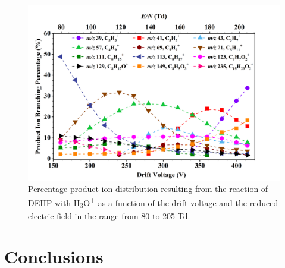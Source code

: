 \begin{figure}
\centering
\includegraphics[height=0.4\textheight]{pics/DEHP-BR.png}
\caption{Percentage product ion distribution  resulting from the reaction of DEHP with H\textsubscript{3}O\textsuperscript{+} as a function of the drift voltage and the reduced electric field in the range from 80 to 205 Td.}
\label{fig:DEHP_fs}
\end{figure}






\section{Conclusions}



